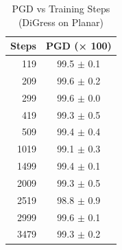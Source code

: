 \begin{table}
\centering
\caption{PGD vs Training Steps (DiGress on Planar)}
\begin{tabular}{rc}
\toprule
\textbf{Steps} & \textbf{PGD (× 100)} \\
\midrule
119 & 99.5 $\pm$ 0.1 \\
209 & 99.6 $\pm$ 0.2 \\
299 & 99.6 $\pm$ 0.0 \\
419 & 99.3 $\pm$ 0.5 \\
509 & 99.4 $\pm$ 0.4 \\
1019 & 99.1 $\pm$ 0.3 \\
1499 & 99.4 $\pm$ 0.1 \\
2009 & 99.3 $\pm$ 0.5 \\
2519 & 98.8 $\pm$ 0.9 \\
2999 & 99.6 $\pm$ 0.1 \\
3479 & 99.3 $\pm$ 0.2 \\
\bottomrule
\end{tabular}
\end{table}